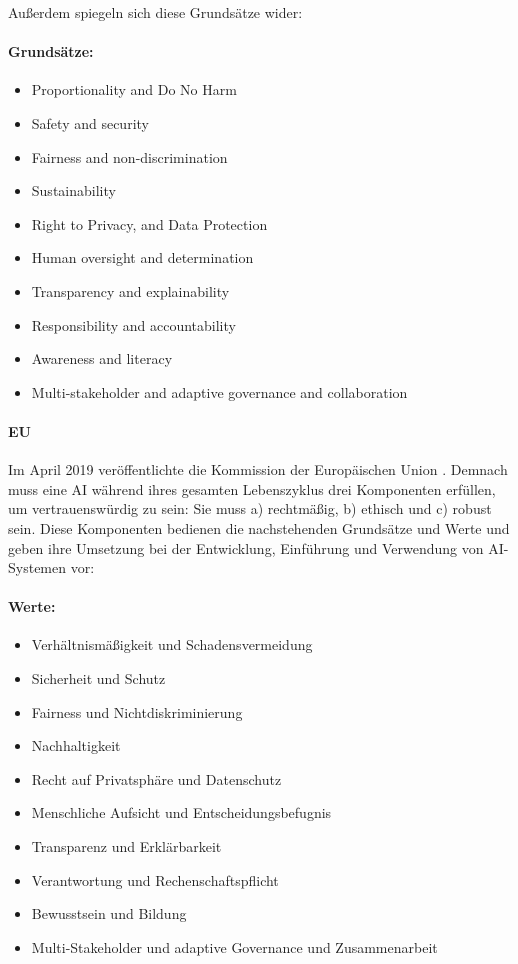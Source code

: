 \documentclass[12pt]{report}
\begin{document}
Außerdem spiegeln sich diese Grundsätze wider:

\paragraph{Grundsätze:}
\begin{itemize}
	\item  Proportionality and Do No Harm
	\item  Safety and security
	\item  Fairness and non-discrimination
	\item  Sustainability
	\item  Right to Privacy, and Data Protection
	\item  Human oversight and determination
	\item  Transparency and explainability
	\item  Responsibility and accountability
	\item  Awareness and literacy
	\item  Multi-stakeholder and adaptive governance and collaboration
\end{itemize}
\paragraph{EU\cite{EUCommision}\\}
Im April 2019 veröffentlichte die Kommission der Europäischen Union \cite{EUCommision}.
Demnach muss eine AI während ihres gesamten Lebenszyklus drei Komponenten erfüllen, um vertrauenswürdig zu sein: Sie muss a) rechtmäßig, b) ethisch und c) robust sein. Diese Komponenten bedienen die nachstehenden Grundsätze und Werte und geben ihre Umsetzung bei der Entwicklung, Einführung und Verwendung von AI-Systemen vor:

\paragraph{Werte:}
\begin{itemize}
	\item  Verhältnismäßigkeit und Schadensvermeidung
	\item  Sicherheit und Schutz
	\item  Fairness und Nichtdiskriminierung
	\item  Nachhaltigkeit
	\item  Recht auf Privatsphäre und Datenschutz
	\item  Menschliche Aufsicht und Entscheidungsbefugnis
	\item  Transparenz und Erklärbarkeit
	\item  Verantwortung und Rechenschaftspflicht
	\item  Bewusstsein und Bildung
	\item Multi-Stakeholder und adaptive Governance und Zusammenarbeit
\end{itemize}
\end{document}
